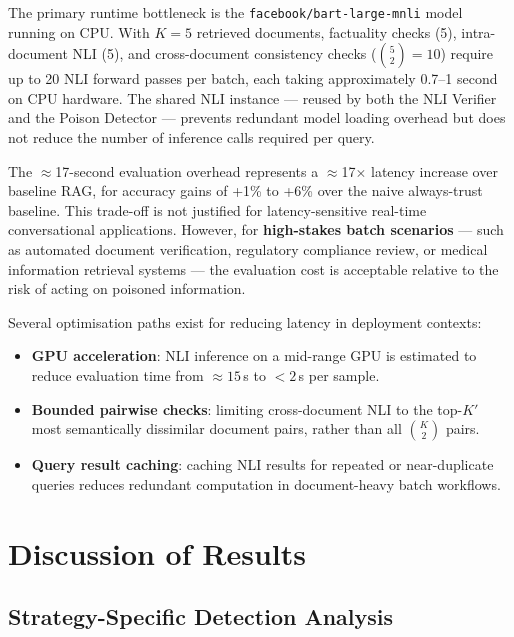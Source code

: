 The primary runtime bottleneck is the \texttt{facebook/bart-large-mnli} model running on
CPU. With $K=5$ retrieved documents, factuality checks (5), intra-document NLI (5), and
cross-document consistency checks ($\binom{5}{2}=10$) require up to 20 NLI forward passes
per batch, each taking approximately 0.7--1 second on CPU hardware. The shared NLI instance --- reused by both the NLI Verifier and the Poison
Detector --- prevents redundant model loading overhead but does not reduce the number of
inference calls required per query.

The $\approx$17-second evaluation overhead represents a $\approx$17$\times$ latency increase
over baseline RAG, for accuracy gains of +1\% to +6\% over the naive always-trust baseline. This
trade-off is not justified for latency-sensitive real-time conversational applications.
However, for \textbf{high-stakes batch scenarios} --- such as automated document
verification, regulatory compliance review, or medical information retrieval systems ---
the evaluation cost is acceptable relative to the risk of acting on poisoned information.

Several optimisation paths exist for reducing latency in deployment contexts:

\begin{itemize}
    \item \textbf{GPU acceleration}: NLI inference on a mid-range GPU is estimated to reduce
    evaluation time from $\approx 15$\,s to $<2$\,s per sample.

    \item \textbf{Bounded pairwise checks}: limiting cross-document NLI to the top-$K'$ most
    semantically dissimilar document pairs, rather than all $\binom{K}{2}$ pairs.

    \item \textbf{Query result caching}: caching NLI results for repeated or near-duplicate
    queries reduces redundant computation in document-heavy batch workflows.
\end{itemize}

\section{Discussion of Results}
\label{sec:ch6_discussion}

\subsection{Strategy-Specific Detection Analysis}

